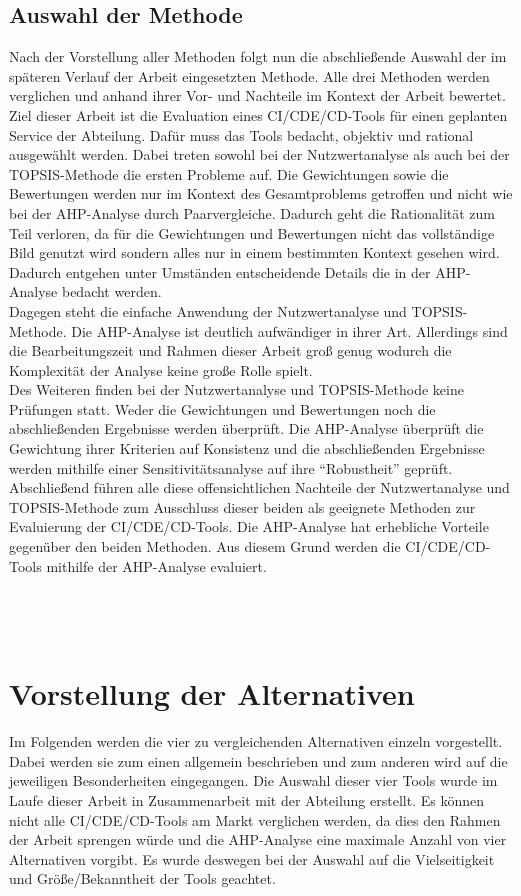 \subsection{Auswahl der Methode}
Nach der Vorstellung aller Methoden folgt nun die abschließende Auswahl der im späteren Verlauf der Arbeit eingesetzten Methode. Alle drei Methoden werden verglichen und anhand ihrer Vor- und Nachteile im Kontext der Arbeit bewertet.\\
Ziel dieser Arbeit ist die Evaluation eines \ac{CI}/\ac{CDE}/\ac{CD}-Tools für einen geplanten Service der Abteilung. Dafür muss das Tools bedacht, objektiv und rational ausgewählt werden. Dabei treten sowohl bei der Nutzwertanalyse als auch bei der TOPSIS-Methode die ersten Probleme auf. Die Gewichtungen sowie die Bewertungen werden nur im Kontext des Gesamtproblems getroffen und nicht wie bei der AHP-Analyse durch Paarvergleiche. Dadurch geht die Rationalität zum Teil verloren, da für die Gewichtungen und Bewertungen nicht das vollständige Bild genutzt wird sondern alles nur in einem bestimmten Kontext gesehen wird. Dadurch entgehen unter Umständen entscheidende Details die in der AHP-Analyse bedacht werden.\\
Dagegen steht die einfache Anwendung der Nutzwertanalyse und TOPSIS-Methode. Die AHP-Analyse ist deutlich aufwändiger in ihrer Art. Allerdings sind die Bearbeitungszeit und Rahmen dieser Arbeit groß genug wodurch die Komplexität der Analyse keine große Rolle spielt.\\
Des Weiteren finden bei der Nutzwertanalyse und TOPSIS-Methode keine Prüfungen statt. Weder die Gewichtungen und Bewertungen noch die abschließenden Ergebnisse werden überprüft. Die AHP-Analyse überprüft die Gewichtung ihrer Kriterien auf Konsistenz und die abschließenden Ergebnisse werden mithilfe einer Sensitivitätsanalyse auf ihre \enquote{Robustheit} geprüft.\\
Abschließend führen alle diese offensichtlichen Nachteile der Nutzwertanalyse und TOPSIS-Methode zum Ausschluss dieser beiden als geeignete Methoden zur Evaluierung der \ac{CI}/\ac{CDE}/\ac{CD}-Tools. Die AHP-Analyse hat erhebliche Vorteile gegenüber den beiden Methoden. Aus diesem Grund werden die \ac{CI}/\ac{CDE}/\ac{CD}-Tools mithilfe der AHP-Analyse evaluiert.\\
\\
\\
\\
\section{Vorstellung der Alternativen}
Im Folgenden werden die vier zu vergleichenden Alternativen einzeln vorgestellt. Dabei werden sie zum einen allgemein beschrieben und zum anderen wird auf die jeweiligen Besonderheiten eingegangen. Die Auswahl dieser vier Tools wurde im Laufe dieser Arbeit in Zusammenarbeit mit der Abteilung erstellt. Es können nicht alle \ac{CI}/\ac{CDE}/\ac{CD}-Tools am Markt verglichen werden, da dies den Rahmen der Arbeit sprengen würde und die AHP-Analyse eine maximale Anzahl von vier Alternativen vorgibt. Es wurde deswegen bei der Auswahl auf die Vielseitigkeit und Größe/Bekanntheit der Tools geachtet.
